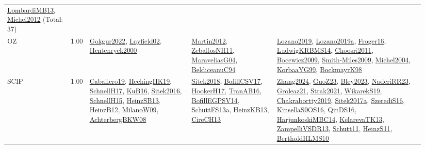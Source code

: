 {\begin{longtable}{p{3cm}r>{\raggedright\arraybackslash}p{6cm}>{\raggedright\arraybackslash}p{6cm}>{\raggedright\arraybackslash}p{8cm}}
\hyperref[detail:LombardiMB13]{LombardiMB13}, \hyperref[detail:Michel2012]{Michel2012} (Total: 37)\\
\index{OZ}\index{CPSystems!OZ}OZ &  1.00 & \hyperref[detail:Gokgur2022]{Gokgur2022}, \hyperref[detail:Layfield02]{Layfield02}, \hyperref[detail:Hentenryck2000]{Hentenryck2000} & \hyperref[detail:Martin2012]{Martin2012}, \hyperref[detail:ZeballosNH11]{ZeballosNH11}, \hyperref[detail:MaraveliasG04]{MaraveliasG04}, \hyperref[detail:BeldiceanuC94]{BeldiceanuC94} & \hyperref[detail:Lozano2019]{Lozano2019}, \hyperref[detail:Lozano2019a]{Lozano2019a}, \hyperref[detail:Froger16]{Froger16}, \hyperref[detail:LudwigKRBMS14]{LudwigKRBMS14}, \hyperref[detail:Choosri2011]{Choosri2011}, \hyperref[detail:Bocewicz2009]{Bocewicz2009}, \hyperref[detail:Smith-Miles2009]{Smith-Miles2009}, \hyperref[detail:Michel2004]{Michel2004}, \hyperref[detail:KorbaaYG99]{KorbaaYG99}, \hyperref[detail:BockmayrK98]{BockmayrK98}\\
\index{SCIP}\index{CPSystems!SCIP}SCIP &  1.00 & \hyperref[detail:Caballero19]{Caballero19}, \hyperref[detail:HechingHK19]{HechingHK19}, \hyperref[detail:SchnellH17]{SchnellH17}, \hyperref[detail:KuB16]{KuB16}, \hyperref[detail:Sitek2016]{Sitek2016}, \hyperref[detail:SchnellH15]{SchnellH15}, \hyperref[detail:HeinzSB13]{HeinzSB13}, \hyperref[detail:HeinzB12]{HeinzB12}, \hyperref[detail:MilanoW09]{MilanoW09}, \hyperref[detail:AchterbergBKW08]{AchterbergBKW08} & \hyperref[detail:Sitek2018]{Sitek2018}, \hyperref[detail:BofillCSV17]{BofillCSV17}, \hyperref[detail:HookerH17]{HookerH17}, \hyperref[detail:TranAB16]{TranAB16}, \hyperref[detail:BofillEGPSV14]{BofillEGPSV14}, \hyperref[detail:SchuttFS13a]{SchuttFS13a}, \hyperref[detail:HeinzKB13]{HeinzKB13}, \hyperref[detail:CireCH13]{CireCH13} & \hyperref[detail:Zhang2024]{Zhang2024}, \hyperref[detail:GuoZ23]{GuoZ23}, \hyperref[detail:Bley2023]{Bley2023}, \hyperref[detail:NaderiRR23]{NaderiRR23}, \hyperref[detail:Groleaz21]{Groleaz21}, \hyperref[detail:Strak2021]{Strak2021}, \hyperref[detail:WikarekS19]{WikarekS19}, \hyperref[detail:Chakrabortty2019]{Chakrabortty2019}, \hyperref[detail:Sitek2017a]{Sitek2017a}, \hyperref[detail:SzerediS16]{SzerediS16}, \hyperref[detail:KinsellaS0OS16]{KinsellaS0OS16}, \hyperref[detail:QinDS16]{QinDS16}, \hyperref[detail:HarjunkoskiMBC14]{HarjunkoskiMBC14}, \hyperref[detail:KelarevaTK13]{KelarevaTK13}, \hyperref[detail:ZampelliVSDR13]{ZampelliVSDR13}, \hyperref[detail:Schutt11]{Schutt11}, \hyperref[detail:HeinzS11]{HeinzS11}, \hyperref[detail:BertholdHLMS10]{BertholdHLMS10}\\

\end{longtable}}
